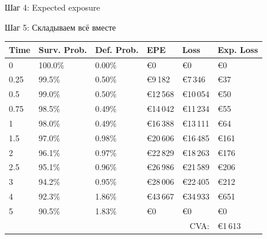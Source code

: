 \documentclass{beamer}
\begin{document}
\begin{frame}{Шаг 4: Expected exposure}
\begin{figure}
\centering
\end{figure}
\end{frame}



\begin{frame}{Шаг 5: Складываем всё вместе}
\begin{tabular}{l|l|l|l|l|l}
Time & Surv. Prob. & Def. Prob. & EPE & Loss & Exp. Loss \\
 \hline
0		& 100.0\%	& 0.00\%	& \euro 0			& \euro 0			& \euro 0 		\\
0.25	& 99.5\%	& 0.50\%	& \euro 9\,182		& \euro 7\,346		& \euro 37		\\
0.5		& 99.0\%	& 0.50\%	& \euro 12\,568	& \euro 10\,054	& \euro 50		\\
0.75	& 98.5\%	& 0.49\%	& \euro 14\,042	& \euro 11\,234	& \euro 55		\\
1		& 98.0\%	& 0.49\%	& \euro 16\,388	& \euro 13\,111	& \euro 64		\\
1.5		& 97.0\%	& 0.98\%	& \euro 20\,606	& \euro 16\,485	& \euro 161	\\
2		& 96.1\%	& 0.97\%	& \euro 22\,829	& \euro 18\,263	& \euro 176	\\
2.5		& 95.1\%	& 0.96\%	& \euro 26\,986	& \euro 21\,589	& \euro 206	\\
3		& 94.2\%	& 0.95\%	& \euro 28\,006	& \euro 22\,405	& \euro 212	\\
4		& 92.3\%	& 1.86\%	& \euro 43\,667	& \euro 34\,933	& \euro 651	\\
5		& 90.5\%	& 1.83\%	& \euro 0			& \euro 0			& \euro 0		\\
\hline
\multicolumn{5}{r}{CVA:} & \euro1\,613
\end{tabular}
\end{frame}
\end{document}
